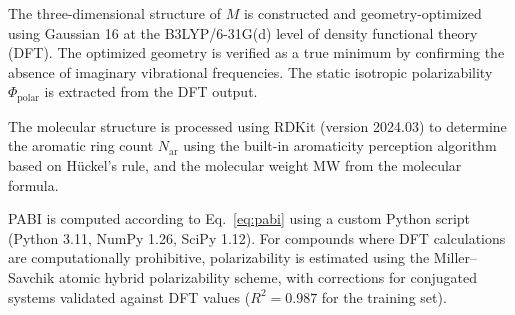 \documentclass[12pt,a4paper]{article}
\begin{document}
\begin{description}[leftmargin=1.5em, font=\normalfont\bfseries]
\item[Step 1.] The three-dimensional structure of $M$ is constructed and geometry-optimized using Gaussian 16\cite{frisch2016gaussian} at the B3LYP/6-31G(d) level of density functional theory (DFT). The optimized geometry is verified as a true minimum by confirming the absence of imaginary vibrational frequencies. The static isotropic polarizability $\Phi_{\text{polar}}$ is extracted from the DFT output.

\item[Step 2.] The molecular structure is processed using RDKit (version 2024.03)\cite{rdkit2024} to determine the aromatic ring count $N_{\text{ar}}$ using the built-in aromaticity perception algorithm based on H\"{u}ckel's rule, and the molecular weight MW from the molecular formula.

\item[Step 3.] PABI is computed according to Eq.~\eqref{eq:pabi} using a custom Python script (Python 3.11, NumPy 1.26, SciPy 1.12). For compounds where DFT calculations are computationally prohibitive, polarizability is estimated using the Miller--Savchik atomic hybrid polarizability scheme\cite{miller2007molecular}, with corrections for conjugated systems validated against DFT values ($R^2 = 0.987$ for the training set).
\end{description}
\end{document}
